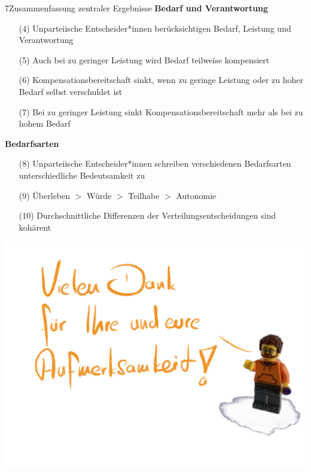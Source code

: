 \documentclass[xcolor=table,9pt,aspectratio=169]{beamer}
\begin{document}
\begin{frame}{\vspace*{10mm}7\hspace*{1em}Zusammenfassung zentraler Ergebnisse}
\textbf{Bedarf und Verantwortung}\\
\medskip
\begin{itemize}
   \item[(4)] Unparteiische Entscheider*innen berücksichtigen Bedarf, Leistung und Verantwortung
   \item[(5)] Auch bei zu geringer Leistung wird Bedarf teilweise kompensiert
   \item[(6)] Kompensationsbereitschaft sinkt, wenn zu geringe Leistung oder zu hoher Bedarf selbst verschuldet ist
   \item[(7)] Bei zu geringer Leistung sinkt Kompensationsbereitschaft mehr als bei zu hohem Bedarf
\end{itemize}
\vspace{2em}
\textbf{Bedarfsarten}\\
\medskip
\begin{itemize}
   \item[(8)] Unparteiische Entscheider*innen schreiben verschiedenen Bedarfsarten unterschiedliche Bedeutsamkeit zu
   \item[(9)] Überleben $>$ Würde $>$ Teilhabe $>$ Autonomie
   \item[(10)] Durchschnittliche Differenzen der Verteilungsentscheidungen sind kohärent
   \end{itemize}
\end{frame}


\begin{frame}{}
\begin{center}
   \includegraphics[width=0.8\linewidth]{figures/slides_thanks.pdf}
\end{center}
\end{frame}
\end{document}
